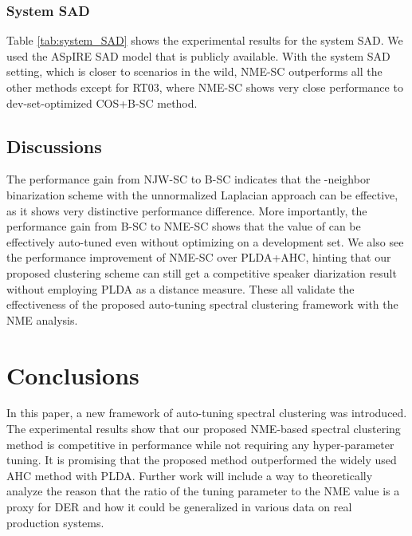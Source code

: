 \documentclass[journal]{IEEEtran}
\begin{document}
\subsubsection{System SAD} Table \ref{tab:system_SAD} shows the experimental results for the system SAD. We used the ASpIRE SAD model \cite{povey2011kaldi} that is publicly available. With the system SAD setting, which is closer to scenarios in the wild, NME-SC outperforms all the other methods except for RT03, where NME-SC shows very close performance to dev-set-optimized COS+B-SC method. 


\vspace{-1ex}
\subsection{Discussions}
The performance gain from NJW-SC to B-SC indicates that the -neighbor binarization scheme with the unnormalized Laplacian approach can be effective, as it shows very distinctive performance difference. More importantly, the performance gain from B-SC to NME-SC shows that the value of  can be effectively auto-tuned even without optimizing on a development set. We also see the performance improvement of NME-SC over PLDA+AHC, hinting that our proposed clustering scheme can still get a competitive speaker diarization result without employing PLDA as a distance measure. These all validate the effectiveness of the proposed auto-tuning spectral clustering framework with the NME analysis. 

\vspace{-1ex}
\section{Conclusions}
In this paper, a new framework of auto-tuning spectral clustering was introduced. The experimental results show that our proposed NME-based spectral clustering method is competitive in performance while not requiring any hyper-parameter tuning. It is promising that the proposed method outperformed the widely used AHC method with PLDA. Further work will include a way to theoretically analyze the reason that the ratio of the tuning parameter  to the NME value  is a proxy for DER and how it could be generalized in various data on real production systems. 



\balance
\end{document}
